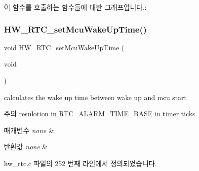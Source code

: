 이 함수를 호출하는 함수들에 대한 그래프입니다.\+:
\mbox{\label{group___lory_s_d_k___r_t_c___functions_ga3039d2d62291e76e72912133676433fd}} 
\subsubsection{\texorpdfstring{H\+W\+\_\+\+R\+T\+C\+\_\+set\+Mcu\+Wake\+Up\+Time()}{HW\_RTC\_setMcuWakeUpTime()}}
{\footnotesize\ttfamily void H\+W\+\_\+\+R\+T\+C\+\_\+set\+Mcu\+Wake\+Up\+Time (\begin{DoxyParamCaption}\item[{void}]{ }\end{DoxyParamCaption})}



calculates the wake up time between wake up and mcu start 

\begin{DoxyNote}{주의}
resulotion in R\+T\+C\+\_\+\+A\+L\+A\+R\+M\+\_\+\+T\+I\+M\+E\+\_\+\+B\+A\+SE in timer ticks 
\end{DoxyNote}

\begin{DoxyParams}{매개변수}
{\em none} & \\
\hline
\end{DoxyParams}

\begin{DoxyRetVals}{반환값}
{\em none} & \\
\hline
\end{DoxyRetVals}


hw\+\_\+rtc.\+c 파일의 252 번째 라인에서 정의되었습니다.


